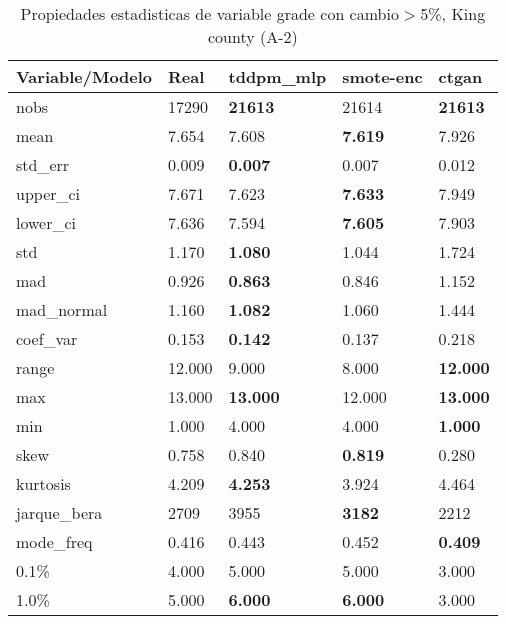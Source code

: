 \begin{table}[H]
\centering
\fontsize{8}{14}\selectfont
\caption{Propiedades estadisticas de variable grade con cambio\ensuremath{>}5\%, King county (A-2)}
\label{table-stats-king county-a-2-grade-short}
\begin{tabular}{|l|m{10em}|m{10em}|m{10em}|m{10em}|}
\hline
 \rowcolor[gray]{0.8}
Variable/Modelo & Real & tddpm\_mlp & smote-enc & ctgan \\
\hline nobs & 17290 & \bfseries 21613 & \cellcolor[rgb]{0.9, 0.54, 0.52} 21614 & \bfseries 21613 \\
\hline mean & 7.654 & 7.608 & \bfseries 7.619 & \cellcolor[rgb]{0.9, 0.54, 0.52} 7.926 \\
\hline std\_err & 0.009 & \bfseries 0.007 & 0.007 & \cellcolor[rgb]{0.9, 0.54, 0.52} 0.012 \\
\hline upper\_ci & 7.671 & 7.623 & \bfseries 7.633 & \cellcolor[rgb]{0.9, 0.54, 0.52} 7.949 \\
\hline lower\_ci & 7.636 & 7.594 & \bfseries 7.605 & \cellcolor[rgb]{0.9, 0.54, 0.52} 7.903 \\
\hline std & 1.170 & \bfseries 1.080 & 1.044 & \cellcolor[rgb]{0.9, 0.54, 0.52} 1.724 \\
\hline mad & 0.926 & \bfseries 0.863 & 0.846 & \cellcolor[rgb]{0.9, 0.54, 0.52} 1.152 \\
\hline mad\_normal & 1.160 & \bfseries 1.082 & 1.060 & \cellcolor[rgb]{0.9, 0.54, 0.52} 1.444 \\
\hline coef\_var & 0.153 & \bfseries 0.142 & 0.137 & \cellcolor[rgb]{0.9, 0.54, 0.52} 0.218 \\
\hline range & 12.000 & 9.000 & \cellcolor[rgb]{0.9, 0.54, 0.52} 8.000 & \bfseries 12.000 \\
\hline max & 13.000 & \bfseries 13.000 & \cellcolor[rgb]{0.9, 0.54, 0.52} 12.000 & \bfseries 13.000 \\
\hline min & 1.000 & \cellcolor[rgb]{0.9, 0.54, 0.52} 4.000 & \cellcolor[rgb]{0.9, 0.54, 0.52} 4.000 & \bfseries 1.000 \\
\hline skew & 0.758 & 0.840 & \bfseries 0.819 & \cellcolor[rgb]{0.9, 0.54, 0.52} 0.280 \\
\hline kurtosis & 4.209 & \bfseries 4.253 & \cellcolor[rgb]{0.9, 0.54, 0.52} 3.924 & 4.464 \\
\hline jarque\_bera & 2709 & \cellcolor[rgb]{0.9, 0.54, 0.52} 3955 & \bfseries 3182 & 2212 \\
\hline mode\_freq & 0.416 & 0.443 & \cellcolor[rgb]{0.9, 0.54, 0.52} 0.452 & \bfseries 0.409 \\
\hline 0.1\% & 4.000 & 5.000 & 5.000 & 3.000 \\
\hline 1.0\% & 5.000 & \bfseries 6.000 & \bfseries 6.000 & \cellcolor[rgb]{0.9, 0.54, 0.52} 3.000 \\
\hline
\end{tabular}
\end{table}
